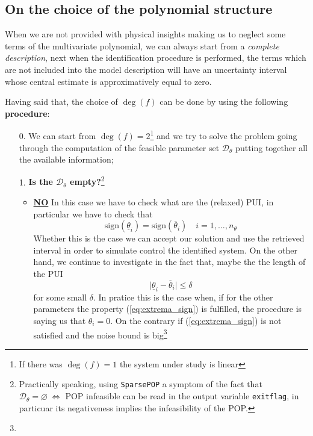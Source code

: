 \subsection{On the choice of the polynomial structure}
When we are not provided with physical insights making us to neglect some terms of the multivariate polynomial, we can always start from a \textit{complete description}, next when the identification procedure is performed, the terms which are not included into the model description will have an uncertainty interval whose central estimate is approximatively equal to zero.

Having said that, the choice of $\deg(f)$ can be done by using the following \textbf{procedure}: 
\begin{enumerate}
    \item[0.] We can start from $\deg(f)=2$\footnote{
        If there was $\deg(f)=1$ the system under study is linear
    } and we try to solve the problem going through the computation of the feasible parameter set $\mathcal{D}_\theta$ putting together all the available information;\item[1.]\textbf{\large Is the $\mathcal{D}_\theta$ empty?}\footnote{
        Practically speaking, using \texttt{SparsePOP} a symptom of the fact that $\mathcal{D}_\theta=\varnothing \ \iff $ POP infeasible can be read in the output variable \texttt{exitflag}, in particuar its negativeness implies the infeasibility of the POP. 
    }
    \begin{itemize}
        \itemsep-0.3em
        \item {\Large{\color{green}\underline{\textbf{NO}}}} In this case we have to check what are the (relaxed) PUI, in particular we have to check that
        \begin{equation} \label{eq:extrema_sign}
            \text{sign}(\underline{\theta}_i) = 
            \text{sign}(\overline{\theta}_i) \quad i=1,\dots,n_\theta
        \end{equation} 
        Whether this is the case we can accept our solution and use the retrieved interval in order to simulate control the identified system. On the other hand, we continue to investigate in the fact that, maybe the the length of the PUI
        \begin{equation}
            \vert \underline{\theta}_i-\overline{\theta}_i \vert \le \delta
        \end{equation}
         for some small $\delta$. In pratice this is the case when, if for the other parameters the property (\ref{eq:extrema_sign}) is fulfilled, the procedure is saying us that $\theta_i=0$. On the contrary if (\ref{eq:extrema_sign}) is not satisfied and the noise bound is big\footnote{
}
\end{itemize}
\end{enumerate}
